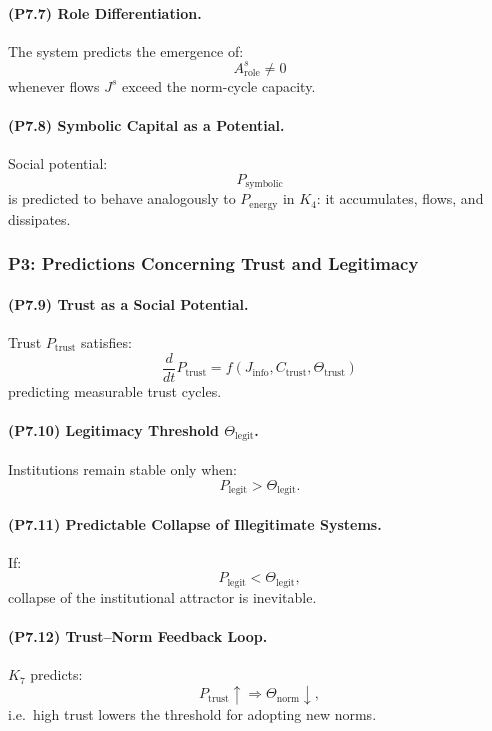 \paragraph{(P7.7) Role Differentiation.}
The system predicts the emergence of:
\[
A_{\mathrm{role}}^s \neq 0
\]
whenever flows $J^s$ exceed the norm-cycle capacity.

\paragraph{(P7.8) Symbolic Capital as a Potential.}
Social potential:
\[
P_{\mathrm{symbolic}}
\]
is predicted to behave analogously to $P_{\mathrm{energy}}$ in $K_4$:
it accumulates, flows, and dissipates.

\subsubsection{P3: Predictions Concerning Trust and Legitimacy}

\paragraph{(P7.9) Trust as a Social Potential.}
Trust $P_{\mathrm{trust}}$ satisfies:
\[
\frac{d}{dt} P_{\mathrm{trust}} = f(J_{\mathrm{info}}, C_{\mathrm{trust}}, \Theta_{\mathrm{trust}})
\]
predicting measurable trust cycles.

\paragraph{(P7.10) Legitimacy Threshold $\Theta_{\mathrm{legit}}$.}
Institutions remain stable only when:
\[
P_{\mathrm{legit}} > \Theta_{\mathrm{legit}}.
\]

\paragraph{(P7.11) Predictable Collapse of Illegitimate Systems.}
If:
\[
P_{\mathrm{legit}} < \Theta_{\mathrm{legit}},
\]
collapse of the institutional attractor is inevitable.

\paragraph{(P7.12) Trust–Norm Feedback Loop.}
$K_7$ predicts:
\[
P_{\mathrm{trust}} \uparrow \Rightarrow \Theta_{\mathrm{norm}} \downarrow,
\]
i.e.\ high trust lowers the threshold for adopting new norms.

